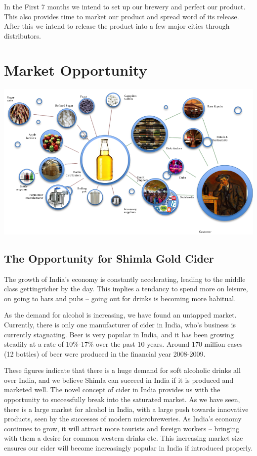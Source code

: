 \documentclass[11pt]{article}
\begin{document}
In the First 7 months we intend to set up our brewery and perfect our product.
This also provides time to market our product and spread word of its release.
After this we intend to release the product into a few major cities through
distributors.

\newpage
\section{Market Opportunity}
  \includegraphics[angle=90,width=\textwidth,height=\textheight,keepaspectratio]
{./supplychain.png}

  \subsection{The Opportunity for Shimla Gold Cider}
The growth of India's economy is constantly accelerating, leading to the middle
class gettingricher by the day. This implies a tendancy to spend more on 
leisure, on going to bars and pubs -- going out for drinks is becoming more
habitual.

As the demand for alcohol is increasing, we have found an untapped market. 
Currently, there is only one manufacturer of cider in India, who's business is 
currently stagnating. Beer is very popular in India, and it has been growing
steadily at a rate of 10\%-17\% over the past 10 years. Around 170 million 
cases (12 bottles) of beer were produced in the financial year 2008-2009.

These figures indicate that there is a huge demand for soft alcoholic drinks all
over India, and we believe Shimla can succeed in India if it is produced and 
marketed well. The novel concept of cider in India provides us with the 
opportunity to successfully break into the saturated market. As we have seen, 
there is a large market for alcohol in India, with a large push towards 
innovative products, seen by the successes of modern microbreweries. As India's 
economy continues to grow, it will attract more tourists and foreign workers --
bringing with them a desire for common western drinks etc. This increasing 
market size ensures our cider will become increasingly popular in India if 
introduced properly.
\end{document}
